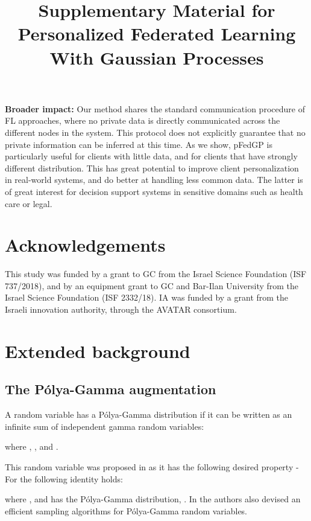 \documentclass{article}
\newcommand{\pg}{P\'olya-Gamma }
\begin{document}
\textbf{Broader impact:} Our method shares the standard communication procedure of FL approaches, where no private data is directly communicated across the different nodes in the system. This protocol does not explicitly guarantee that no private information can be inferred at this time. As we show, pFedGP is particularly useful for clients with little data, and for clients that have strongly different distribution. This has great potential to improve client personalization in real-world systems, and do better at handling less common data. The latter is of great interest for decision support systems in sensitive domains such as health care or legal.


\section*{Acknowledgements} 
This study was funded by a grant to GC from the Israel Science Foundation (ISF 737/2018), and by an equipment grant to GC and Bar-Ilan University from the Israel Science Foundation (ISF 2332/18). IA  was funded by a grant from the Israeli innovation authority, through the AVATAR consortium.






\clearpage

\title{Supplementary Material for Personalized Federated Learning With Gaussian Processes}

\maketitle
\appendix

\section{Extended background}
\subsection{The \pg augmentation} \label{sec_app:pg_back}
A random variable  has a \pg distribution if it can be written as an infinite sum of independent gamma random variables:

where , , and . 

This random variable was proposed in \cite{polya_gamma} as it has the following desired property - For  the following identity holds:

where , and  has the \pg distribution, . In \cite{polya_gamma} the authors also devised an efficient sampling algorithms for \pg random variables.
\end{document}
